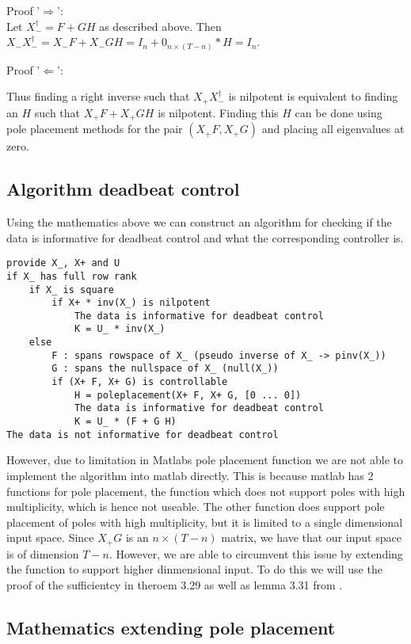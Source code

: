 Proof '$\Rightarrow$': \\
Let $X^\dagger_- = F + G H$ as described above. Then $X_- X^\dagger_- = X_- F + X_- G H = I_n + 0_{n\times (T-n)} * H = I_n$.

Proof '$\Leftarrow$': \\

Thus finding a right inverse such that $X_+ X_-^\dagger$ is nilpotent is equivalent to finding an $H$ such that $X_+ F + X_+ G H$ is nilpotent. Finding this $H$ can be done using pole placement methods for the pair $(X_+ F, X_+ G)$ and placing all eigenvalues at zero.

\subsection{Algorithm deadbeat control}
Using the mathematics above we can construct an algorithm for checking if the data is informative for deadbeat control and what the corresponding controller is.

\begin{lstlisting}
provide X_, X+ and U
if X_ has full row rank
	if X_ is square
		if X+ * inv(X_) is nilpotent
			The data is informative for deadbeat control
			K = U_ * inv(X_)
	else
		F : spans rowspace of X_ (pseudo inverse of X_ -> pinv(X_)) 
		G : spans the nullspace of X_ (null(X_))
		if (X+ F, X+ G) is controllable
			H = poleplacement(X+ F, X+ G, [0 ... 0])
			The data is informative for deadbeat control
			K = U_ * (F + G H)
The data is not informative for deadbeat control
\end{lstlisting}

However, due to limitation in Matlabs pole placement function we are not able to implement the algorithm into matlab directly. This is because matlab has 2 functions for pole placement, the  function which does not support poles with high multiplicity, which is hence not useable. The other function  does support pole placement of poles with high multiplicity, but it is limited to a single dimensional input space. Since $X_+ G$ is an $n \times (T-n)$ matrix, we have that our input space is of dimension $T-n$. However, we are able to circumvent this issue by extending the  function to support higher dinmensional input. To do this we will use the proof of the sufficientcy in theroem 3.29 as well as lemma 3.31 from \cite{bookTrentelman}.

\subsection{Mathematics extending pole placement}

